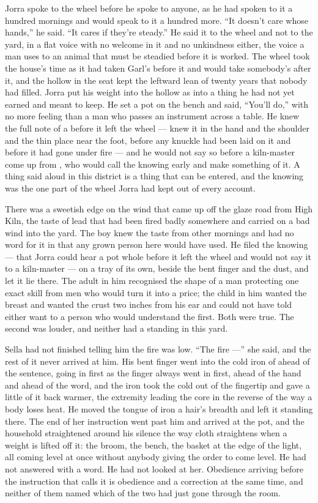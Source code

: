 Jorra spoke to the wheel before he spoke to anyone, as he had spoken to it a hundred mornings and would speak to it a hundred more. “It doesn't care whose hands,” he said. “It cares if they're steady.” He said it to the wheel and not to the yard, in a flat voice with no welcome in it and no unkindness either, the voice a man uses to an animal that must be steadied before it is worked. The wheel took the house's time as it had taken Garl's before it and would take somebody's after it, and the hollow in the seat kept the leftward lean of twenty years that nobody had filled. Jorra put his weight into the hollow as into a thing he had not yet earned and meant to keep. He set a pot on the bench and said, “You'll do,” with no more feeling than a man who passes an instrument across a table. He knew the full note of a  before it left the wheel --- knew it in the hand and the shoulder and the thin place near the foot, before any knuckle had been laid on it and before it had gone under fire --- and he would not say so before a kiln-master come up from , who would call the knowing early and make something of it. A thing said aloud in this district is a thing that can be entered, and the knowing was the one part of the wheel Jorra had kept out of every account.

There was a sweetish edge on the wind that came up off the glaze road from High Kiln, the taste of lead that had been fired badly somewhere and carried on a bad wind into the yard. The boy knew the taste from other mornings and had no word for it in  that any grown person here would have used. He filed the knowing --- that Jorra could hear a pot whole before it left the wheel and would not say it to a kiln-master --- on a tray of its own, beside the bent finger and the dust, and let it lie there. The adult in him recognised the shape of a man protecting one exact skill from men who would turn it into a price; the child in him wanted the breast and wanted the crust two inches from his ear and could not have told either want to a person who would understand the first. Both were true. The second was louder, and neither had a standing in this yard.

Sella had not finished telling him the fire was low. “The fire ---” she said, and the rest of it never arrived at him. His bent finger went into the cold iron of  ahead of the sentence, going in first as the finger always went in first, ahead of the hand and ahead of the word, and the iron took the cold out of the fingertip and gave a little of it back warmer, the extremity leading the core in the reverse of the way a body loses heat. He moved the tongue of iron a hair's breadth and left it standing there. The end of her instruction went past him and arrived at the pot, and the household straightened around his silence the way cloth straightens when a weight is lifted off it: the broom, the bench, the basket at the edge of the light, all coming level at once without anybody giving the order to come level. He had not answered with a word. He had not looked at her. Obedience arriving before the instruction that calls it is obedience and a correction at the same time, and neither of them named which of the two had just gone through the room.


